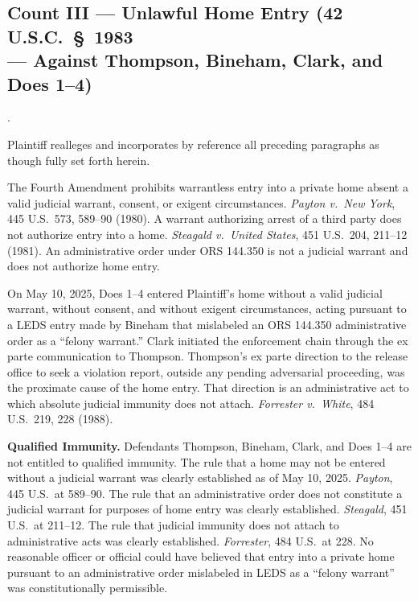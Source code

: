 \documentclass[12pt,letterpaper]{article}
\newcounter{complaintpara}
\newenvironment{paras}{%
	\begin{list}{\arabic{complaintpara}.}{%
			\setlength{\leftmargin}{0.5in}%
			\setlength{\labelwidth}{0.4in}%
			\setlength{\labelsep}{0.1in}%
			\setlength{\itemsep}{0pt}%
			\setlength{\parsep}{0pt}%
			\setlength{\topsep}{6pt}%
		}%
	}{%
	\end{list}%
}
\begin{document}
	\subsection*{Count III --- Unlawful Home Entry (42 U.S.C.\ \S\ 1983\\
		--- Against Thompson, Bineham, Clark, and Does 1--4)}
	\begin{paras}
		
		\item Plaintiff realleges and incorporates by reference all
		preceding paragraphs as though fully set forth herein.
		
		\item The Fourth Amendment prohibits warrantless entry into a
		private home absent a valid judicial warrant, consent, or
		exigent circumstances. \textit{Payton v.\ New York},
		445 U.S.\ 573, 589--90 (1980). A warrant authorizing arrest
		of a third party does not authorize entry into a home.
		\textit{Steagald v.\ United States}, 451 U.S.\ 204, 211--12
		(1981). An administrative order under ORS 144.350 is not a
		judicial warrant and does not authorize home entry.
		
		\item On May 10, 2025, Does 1--4 entered Plaintiff's home
		without a valid judicial warrant, without consent, and without
		exigent circumstances, acting pursuant to a LEDS entry made
		by Bineham that mislabeled an ORS 144.350 administrative
		order as a ``felony warrant.'' Clark initiated the enforcement
		chain through the ex parte communication to Thompson.
		Thompson's ex parte direction to the release office to seek a
		violation report, outside any pending adversarial proceeding,
		was the proximate cause of the home entry. That direction is
		an administrative act to which absolute judicial immunity does
		not attach. \textit{Forrester v.\ White}, 484 U.S.\ 219,
		228 (1988).
		
		\item \textbf{Qualified Immunity.} Defendants Thompson, Bineham,
		Clark, and Does 1--4 are not entitled to qualified immunity.
		The rule that a home may not be entered without a judicial
		warrant was clearly established as of May 10, 2025.
		\textit{Payton}, 445 U.S.\ at 589--90. The rule that an
		administrative order does not constitute a judicial warrant
		for purposes of home entry was clearly established.
		\textit{Steagald}, 451 U.S.\ at 211--12. The rule that
		judicial immunity does not attach to administrative acts was
		clearly established. \textit{Forrester}, 484 U.S.\ at 228.
		No reasonable officer or official could have believed that
		entry into a private home pursuant to an administrative
		order mislabeled in LEDS as a ``felony warrant'' was
		constitutionally permissible.
		

\end{paras}
\end{document}

